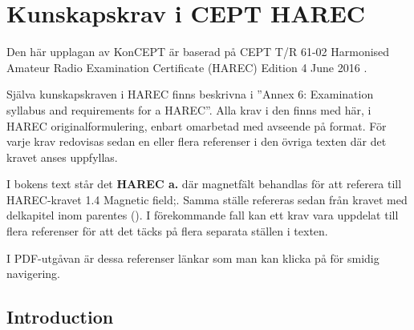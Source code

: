 \chapter{Kunskapskrav i CEPT HAREC}
\label{CEPT HAREC}

\noindent
Den här upplagan av KonCEPT är baserad på CEPT T/R 61-02 Harmonised Amateur
Radio Examination Certificate (HAREC) Edition 4 June 2016 \cite{TR6102}.

Själva kunskapskraven i HAREC finns beskrivna i
''Annex 6: Examination syllabus and requirements for a HAREC''.
Alla krav i den finns med här, i HAREC originalformulering, enbart omarbetad
med avseende på format.
För varje krav redovisas sedan en eller flera referenser i den övriga texten
där det kravet anses uppfyllas.

I bokens text står det \textbf{HAREC a.} där magnetfält
behandlas för att referera till HAREC-kravet 1.4 Magnetic field;.
Samma ställe refereras sedan från kravet med delkapitel inom parentes
().
I förekommande fall kan ett krav vara uppdelat till flera referenser för att
det täcks på flera separata ställen i texten.

I PDF-utgåvan är dessa referenser länkar som man kan klicka på för smidig
navigering.

\section{Introduction}

\makeatletter
\renewcommand{\theenumii}{\arabic{enumii}}
\renewcommand{\labelenumii}{\theenumi.\theenumii}
\renewcommand{\p@enumii}{\theenumi.}

\renewcommand{\theenumiii}{\arabic{enumiii}}
\renewcommand{\labelenumiii}{\theenumi.\theenumii.\theenumiii}
\renewcommand{\p@enumiii}{\theenumi.\theenumii.}
\makeatother

